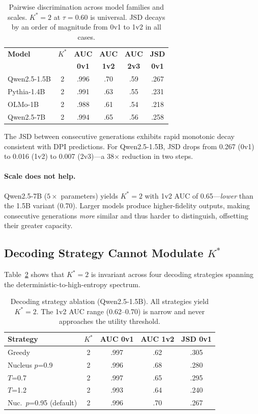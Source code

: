 \documentclass[11pt,a4paper]{article}
\begin{document}
\begin{table}[t]
\centering
\small
\begin{tabular}{lccccc}
\toprule
\textbf{Model} & \textbf{$K^*$} & \textbf{AUC} & \textbf{AUC} & \textbf{AUC} & \textbf{JSD} \\
 & & \textbf{0v1} & \textbf{1v2} & \textbf{2v3} & \textbf{0v1} \\
\midrule
Qwen2.5-1.5B & 2 & .996 & .70 & .59 & .267 \\
Pythia-1.4B   & 2 & .991 & .63 & .55 & .231 \\
OLMo-1B      & 2 & .988 & .61 & .54 & .218 \\
Qwen2.5-7B   & 2 & .994 & .65 & .56 & .258 \\
\bottomrule
\end{tabular}
\caption{Pairwise discrimination across model families and scales. $K^*=2$ at $\tau=0.60$ is universal. JSD decays by an order of magnitude from 0v1 to 1v2 in all cases.}
\label{tab:cross_model}
\end{table}

The JSD between consecutive generations exhibits rapid monotonic decay consistent with DPI predictions.
For Qwen2.5-1.5B, JSD drops from 0.267 (0v1) to 0.016 (1v2) to 0.007 (2v3)---a 38$\times$ reduction in two steps.

\paragraph{Scale does not help.}
Qwen2.5-7B ($5\times$ parameters) yields $K^*=2$ with 1v2 AUC of 0.65---\emph{lower} than the 1.5B variant (0.70).
Larger models produce higher-fidelity outputs, making consecutive generations \emph{more} similar and thus harder to distinguish, offsetting their greater capacity.

\subsection{Decoding Strategy Cannot Modulate $K^*$}

Table~\ref{tab:decoding} shows that $K^*=2$ is invariant across four decoding strategies spanning the deterministic-to-high-entropy spectrum.

\begin{table}[t]
\centering
\small
\begin{tabular}{lcccc}
\toprule
\textbf{Strategy} & \textbf{$K^*$} & \textbf{AUC 0v1} & \textbf{AUC 1v2} & \textbf{JSD 0v1} \\
\midrule
Greedy        & 2 & .997 & .62 & .305 \\
Nucleus $p$=0.9  & 2 & .996 & .68 & .280 \\
$T$=0.7       & 2 & .997 & .65 & .295 \\
$T$=1.2       & 2 & .993 & .64 & .240 \\
Nuc.\ $p$=0.95 (default) & 2 & .996 & .70 & .267 \\
\bottomrule
\end{tabular}
\caption{Decoding strategy ablation (Qwen2.5-1.5B). All strategies yield $K^*=2$. The 1v2 AUC range (0.62--0.70) is narrow and never approaches the utility threshold.}
\label{tab:decoding}
\end{table}
\end{document}
